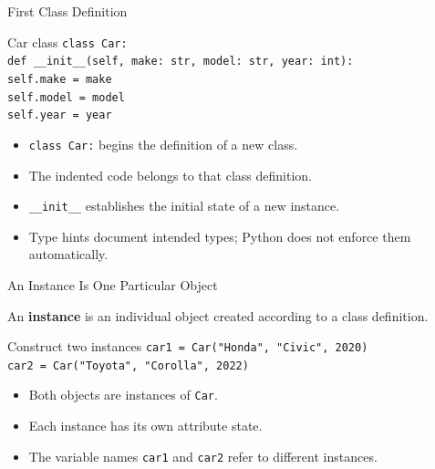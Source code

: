 \documentclass[aspectratio=169,10pt]{beamer}
\begin{document}
\begin{frame}{First Class Definition}
  \begin{block}{Car class}
    \texttt{class Car:}\\
    \hspace*{0.20in}\texttt{def \_\_init\_\_(self, make: str, model: str, year: int):}\\
    \hspace*{0.40in}\texttt{self.make = make}\\
    \hspace*{0.40in}\texttt{self.model = model}\\
    \hspace*{0.40in}\texttt{self.year = year}
  \end{block}

  \begin{itemize}
    \item \texttt{class Car:} begins the definition of a new class.
    \item The indented code belongs to that class definition.
    \item \texttt{\_\_init\_\_} establishes the initial state of a new instance.
    \item Type hints document intended types; Python does not enforce them automatically.
  \end{itemize}
\end{frame}

\begin{frame}{An Instance Is One Particular Object}
  \begin{cpdefinition}
    An \textbf{instance} is an individual object created according to a class definition.
  \end{cpdefinition}

  \begin{block}{Construct two instances}
    \texttt{car1 = Car("Honda", "Civic", 2020)}\\
    \texttt{car2 = Car("Toyota", "Corolla", 2022)}
  \end{block}

  \begin{itemize}
    \item Both objects are instances of \texttt{Car}.
    \item Each instance has its own attribute state.
    \item The variable names \texttt{car1} and \texttt{car2} refer to different instances.
  \end{itemize}
\end{frame}
\end{document}
